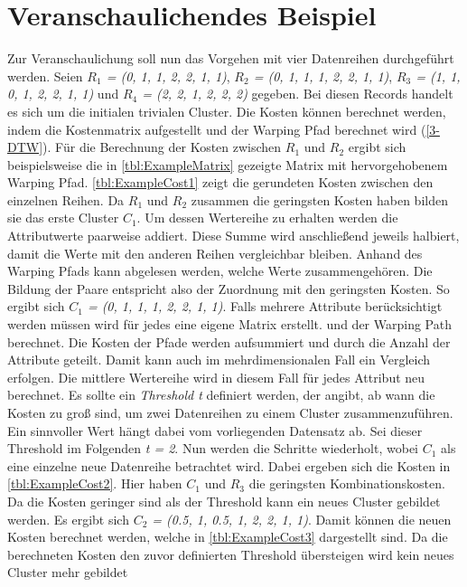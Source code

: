 \section{Veranschaulichendes Beispiel}
\label{3-Example}
Zur Veranschaulichung soll nun das Vorgehen mit vier Datenreihen durchgeführt werden.
Seien \emph{$R_{1}$ = (0, 1, 1, 2, 2, 1, 1)}, \emph{$R_{2}$ = (0, 1, 1, 1, 2, 2, 1, 1)},
\emph{$R_{3}$ = (1, 1, 0, 1, 2, 2, 1, 1)} und \emph{$R_{4}$ = (2, 2, 1, 2, 2, 2)} gegeben.
Bei diesen Records handelt es sich um die initialen trivialen Cluster.
Die Kosten können berechnet werden, indem die Kostenmatrix aufgestellt und der Warping Pfad berechnet wird (\autoref{3-DTW}).
Für die Berechnung der Kosten zwischen \emph{$R_{1}$} und \emph{$R_{2}$} ergibt sich beispielsweise
die in \autoref{tbl:ExampleMatrix} gezeigte Matrix
mit hervorgehobenem Warping Pfad.
\autoref{tbl:ExampleCost1} zeigt die gerundeten Kosten zwischen den einzelnen Reihen.
Da \emph{$R_{1}$} und \emph{$R_{2}$} zusammen die geringsten Kosten haben bilden sie das erste Cluster \emph{$C_{1}$}.
Um dessen Wertereihe zu erhalten werden die Attributwerte paarweise addiert.
Diese Summe wird anschließend jeweils halbiert, damit die Werte mit den anderen Reihen vergleichbar bleiben.
Anhand des Warping Pfads kann abgelesen werden, welche Werte zusammengehören.
Die Bildung der Paare entspricht also der Zuordnung mit den geringsten Kosten.
So ergibt sich \emph{$C_{1}$ = (0, 1, 1, 1, 2, 2, 1, 1)}.
Falls mehrere Attribute berücksichtigt werden müssen wird für jedes eine eigene Matrix erstellt.
und der Warping Path berechnet.
Die Kosten der Pfade werden aufsummiert und durch die Anzahl der Attribute geteilt.
Damit kann auch im mehrdimensionalen Fall ein Vergleich erfolgen.
Die mittlere Wertereihe wird in diesem Fall für jedes Attribut neu berechnet.
Es sollte ein \emph{Threshold t} definiert werden,
der angibt, ab wann die Kosten zu groß sind, um zwei Datenreihen zu einem Cluster zusammenzuführen.
Ein sinnvoller Wert hängt dabei vom vorliegenden Datensatz ab.
Sei dieser Threshold im Folgenden \emph{t = 2}.
Nun werden die Schritte wiederholt, wobei \emph{$C_{1}$} als eine einzelne neue Datenreihe betrachtet wird.
Dabei ergeben sich die Kosten in \autoref{tbl:ExampleCost2}.
Hier haben \emph{$C_{1}$} und \emph{$R_{3}$} die geringsten Kombinationskosten.
Da die Kosten geringer sind als der Threshold kann ein neues Cluster gebildet werden.
Es ergibt sich \emph{$C_{2}$ = (0.5, 1, 0.5, 1, 2, 2, 1, 1)}.
Damit können die neuen Kosten berechnet werden,
welche in \autoref{tbl:ExampleCost3} dargestellt sind.
Da die berechneten Kosten den zuvor definierten Threshold übersteigen wird kein neues Cluster mehr gebildet
